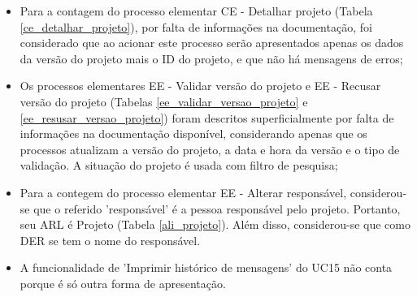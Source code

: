 \begin{itemize}
   \item Para a contagem do processo elementar CE - Detalhar projeto (Tabela \ref{ce_detalhar_projeto}), por falta de informações na documentação,
     foi considerado que ao acionar este processo serão apresentados apenas os dados da versão do projeto mais o ID do projeto, e que não há 
     mensagens de erros;
     
   \item Os processos elementares EE - Validar versão do projeto e EE - Recusar versão do projeto 
    (Tabelas \ref{ee_validar_versao_projeto} e \ref{ee_resusar_versao_projeto}) foram descritos superficialmente por falta de informações
    na documentação disponível, considerando apenas que os processos atualizam a versão do projeto, a data e hora da versão e o tipo 
    de validação. A situação do projeto é usada com filtro de pesquisa;
    
   \item Para a contegem do processo elementar EE - Alterar responsável, considerou-se que o referido 'responsável' é a pessoa
   responsável pelo projeto. Portanto, seu ARL é Projeto (Tabela \ref{ali_projeto}). Além disso, considerou-se que como DER se tem o 
   nome do responsável.
   
   \item A funcionalidade de 'Imprimir histórico de mensagens' do UC15 não conta porque é só outra forma de apresentação.
  \end{itemize}

